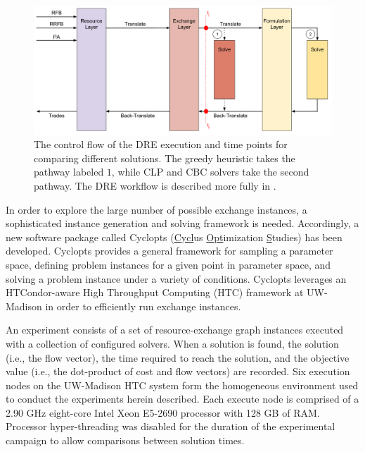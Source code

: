 \documentclass{anstrans}
\begin{document}
\begin{figure}
  \begin{center}
    \includegraphics[width=2\columnwidth]{exchange_xlation_timing.pdf}
    \caption[]{
      \label{fig:dre_time}
      The control flow of the DRE execution and time points for comparing
      different solutions. The greedy heuristic takes the pathway labeled $1$,
      while CLP and CBC solvers take the second pathway. The DRE workflow is
      described more fully in \cite{gidden_agent-based_2013,
        gidden_agent-based_2014}. }
  \end{center}
\end{figure}

In order to explore the large number of possible exchange instances, a
sophisticated instance generation and solving framework is needed. Accordingly,
a new software package called Cyclopts (\underline{Cycl}us
\underline{Opt}imization \underline{S}tudies) \cite{cyclopts} has been
developed. Cyclopts provides a general framework for sampling a parameter space,
defining problem instances for a given point in parameter space, and solving a
problem instance under a variety of conditions. Cyclopts leverages an
HTCondor-aware High Throughput Computing (HTC) framework at UW-Madison in order
to efficiently run exchange instances.

An experiment consists of a set of resource-exchange graph instances executed
with a collection of configured solvers. When a solution is found, the solution
(i.e., the flow vector), the time required to reach the solution, and the
objective value (i.e., the dot-product of cost and flow vectors) are
recorded. Six execution nodes on the UW-Madison HTC system form the
homogeneous environment used to conduct the experiments herein described. Each
execute node is comprised of a 2.90 GHz eight-core Intel Xeon E5-2690 processor
with 128 GB of RAM. Processor hyper-threading was disabled for the duration of
the experimental campaign to allow comparisons between solution times.
\end{document}
